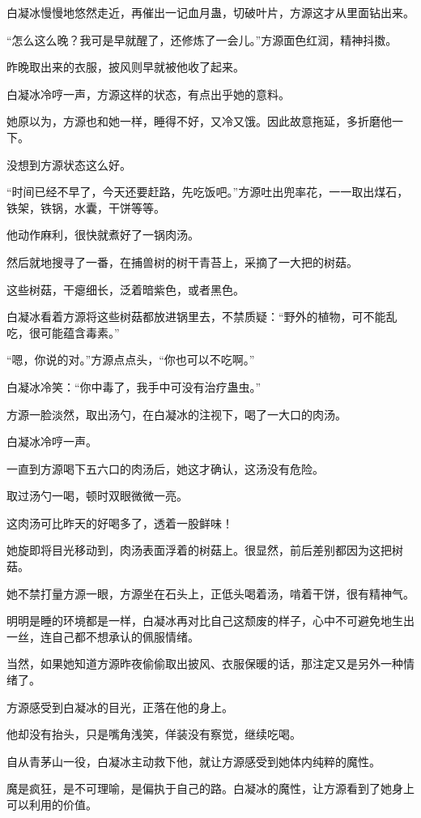 \begin{this_body}
白凝冰慢慢地悠然走近，再催出一记血月蛊，切破叶片，方源这才从里面钻出来。

“怎么这么晚？我可是早就醒了，还修炼了一会儿。”方源面色红润，精神抖擞。

昨晚取出来的衣服，披风则早就被他收了起来。

白凝冰冷哼一声，方源这样的状态，有点出乎她的意料。

她原以为，方源也和她一样，睡得不好，又冷又饿。因此故意拖延，多折磨他一下。

没想到方源状态这么好。

“时间已经不早了，今天还要赶路，先吃饭吧。”方源吐出兜率花，一一取出煤石，铁架，铁锅，水囊，干饼等等。

他动作麻利，很快就煮好了一锅肉汤。

然后就地搜寻了一番，在捕兽树的树干青苔上，采摘了一大把的树菇。

这些树菇，干瘪细长，泛着暗紫色，或者黑色。

白凝冰看着方源将这些树菇都放进锅里去，不禁质疑：“野外的植物，可不能乱吃，很可能蕴含毒素。”

“嗯，你说的对。”方源点点头，“你也可以不吃啊。”

白凝冰冷笑：“你中毒了，我手中可没有治疗蛊虫。”

方源一脸淡然，取出汤勺，在白凝冰的注视下，喝了一大口的肉汤。

白凝冰冷哼一声。

一直到方源喝下五六口的肉汤后，她这才确认，这汤没有危险。

取过汤勺一喝，顿时双眼微微一亮。

这肉汤可比昨天的好喝多了，透着一股鲜味！

她旋即将目光移动到，肉汤表面浮着的树菇上。很显然，前后差别都因为这把树菇。

她不禁打量方源一眼，方源坐在石头上，正低头喝着汤，啃着干饼，很有精神气。

明明是睡的环境都是一样，白凝冰再对比自己这颓废的样子，心中不可避免地生出一丝，连自己都不想承认的佩服情绪。

当然，如果她知道方源昨夜偷偷取出披风、衣服保暖的话，那注定又是另外一种情绪了。

方源感受到白凝冰的目光，正落在他的身上。

他却没有抬头，只是嘴角浅笑，佯装没有察觉，继续吃喝。

自从青茅山一役，白凝冰主动救下他，就让方源感受到她体内纯粹的魔性。

魔是疯狂，是不可理喻，是偏执于自己的路。白凝冰的魔性，让方源看到了她身上可以利用的价值。


\end{this_body}
